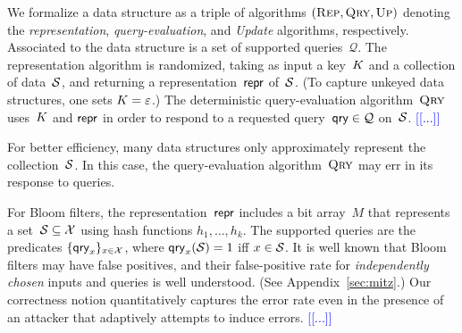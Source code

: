 

%
We formalize a data structure as a triple of algorithms $(\textnormal{\textsc{Rep}}, \textnormal{\textsc{Qry}}, \textnormal{\textsc{Up}})$ denoting
the \emph{representation}, \emph{query-evaluation}, and \emph{Update} algorithms, respectively.
Associated to the data structure is a set of supported queries~$\mathcal{Q}$.
The representation algorithm is randomized, taking as input a
key~$K$ and a collection of data~$\mathcal{S}$, and returning a
representation~$\mathsf{repr}$ of~$\mathcal{S}$.  (To capture unkeyed data structures,
one sets $K=\varepsilon$.)
%
The deterministic query-evaluation algorithm~$\textnormal{\textsc{Qry}}$ uses~$K$ and $\mathsf{repr}$ in
order to respond to a requested query~$\mathsf{qry} \in \mathcal{Q}$ on~$\mathcal{S}$.
\textcolor{blue}{[[...]]}

For better efficiency, many data structures only approximately
represent the collection~$\mathcal{S}$. In this case, the query-evaluation
algorithm~$\textnormal{\textsc{Qry}}$ may err in its response to queries.  

For Bloom filters, the representation~$\mathsf{repr}$ includes a bit array~$M$ that
represents a set~$\mathcal{S} \subseteq \mathcal{X}$ using hash functions
$h_1,\ldots,h_k$. The supported queries are the predicates
$\{\mathsf{qry}_x\}_{x\in\mathcal{X}}$, where $\mathsf{qry}_x(\mathcal{S})=1$ iff $x \in \mathcal{S}$. It is well
known that Bloom filters may have false positives, and their false-positive rate
for \emph{independently chosen} inputs and queries is well understood. (See
Appendix~\ref{sec:mitz}.) Our correctness notion quantitatively captures the
error rate even in the presence of an attacker that adaptively attempts to
induce errors. \textcolor{blue}{[[...]]}

